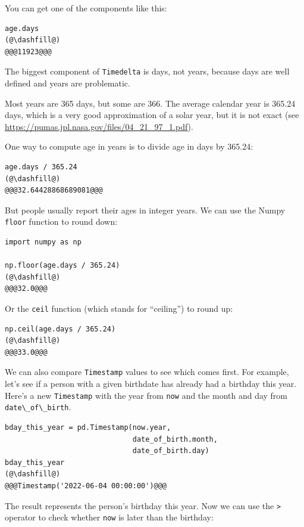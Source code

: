 You can get one of the components like this:

\begin{lstlisting}[]
age.days
(@\dashfill@)
@@@11923@@@
\end{lstlisting}

The biggest component of \passthrough{\lstinline!Timedelta!} is days,
not years, because days are well defined and years are problematic.

Most years are 365 days, but some are 366. The average calendar year is
365.24 days, which is a very good approximation of a solar year, but it
is not exact (see
\url{https://pumas.jpl.nasa.gov/files/04_21_97_1.pdf}).

One way to compute age in years is to divide age in days by 365.24:

\begin{lstlisting}[]
age.days / 365.24
(@\dashfill@)
@@@32.64428868689081@@@
\end{lstlisting}

But people usually report their ages in integer years. We can use the
Numpy \passthrough{\lstinline!floor!} function to round down:

\begin{lstlisting}[]
import numpy as np

np.floor(age.days / 365.24)
(@\dashfill@)
@@@32.0@@@
\end{lstlisting}

Or the \passthrough{\lstinline!ceil!} function (which stands for
``ceiling'') to round up:

\begin{lstlisting}[]
np.ceil(age.days / 365.24)
(@\dashfill@)
@@@33.0@@@
\end{lstlisting}

We can also compare \passthrough{\lstinline!Timestamp!} values to see
which comes first. For example, let's see if a person with a given
birthdate has already had a birthday this year. Here's a new
\passthrough{\lstinline!Timestamp!} with the year from
\passthrough{\lstinline!now!} and the month and day from
\passthrough{\lstinline!date\_of\_birth!}.

\begin{lstlisting}[]
bday_this_year = pd.Timestamp(now.year, 
                              date_of_birth.month, 
                              date_of_birth.day)
bday_this_year
(@\dashfill@)
@@@Timestamp('2022-06-04 00:00:00')@@@
\end{lstlisting}

The result represents the person's birthday this year. Now we can use
the \passthrough{\lstinline!>!} operator to check whether
\passthrough{\lstinline!now!} is later than the birthday:


